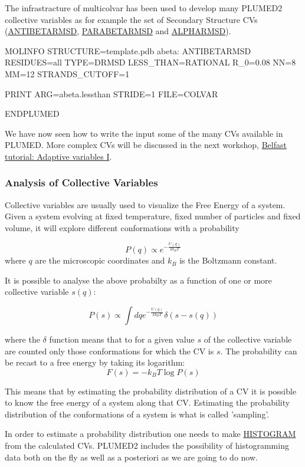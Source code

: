 The infrastracture of multicolvar has been used to develop many P\+L\+U\+M\+E\+D2 collective variables as for example the set of Secondary Structure C\+Vs (\hyperlink{ANTIBETARMSD}{A\+N\+T\+I\+B\+E\+T\+A\+R\+M\+S\+D}, \hyperlink{PARABETARMSD}{P\+A\+R\+A\+B\+E\+T\+A\+R\+M\+S\+D} and \hyperlink{ALPHARMSD}{A\+L\+P\+H\+A\+R\+M\+S\+D}).

\begin{DoxyVerb}MOLINFO STRUCTURE=template.pdb
abeta: ANTIBETARMSD RESIDUES=all TYPE=DRMSD LESS_THAN={RATIONAL R_0=0.08 NN=8 MM=12} STRANDS_CUTOFF=1

PRINT ARG=abeta.lessthan STRIDE=1 FILE=COLVAR 

ENDPLUMED
\end{DoxyVerb}


We have now seen how to write the input some of the many C\+Vs available in P\+L\+U\+M\+E\+D. More complex C\+Vs will be discussed in the next workshop, \hyperlink{belfast-2}{Belfast tutorial\+: Adaptive variables I}.\hypertarget{belfast-1_analysis}{}\subsubsection{Analysis of Collective Variables}\label{belfast-1_analysis}
Collective variables are usually used to visualize the Free Energy of a system. Given a system evolving at fixed temperature, fixed number of particles and fixed volume, it will explore different conformations with a probability

\[ P(q)\propto e^{-\frac{U(q)}{kb_BT}} \] where $ q $ are the microscopic coordinates and $ k_B $ is the Boltzmann constant.

It is possible to analyse the above probabilty as a function of one or more collective variable $ s(q)$\+:

\[ P(s)\propto \int dq e^{-\frac{U(q)}{kb_BT}} \delta(s-s(q)) \]

where the $ \delta $ function means that to for a given value $ s$ of the collective variable are counted only those conformations for which the C\+V is $ s$. The probability can be recast to a free energy by taking its logarithm\+: \[ F(s)=-k_B T \log P(s) \]

This means that by estimating the probability distribution of a C\+V it is possible to know the free energy of a system along that C\+V. Estimating the probability distribution of the conformations of a system is what is called 'sampling'.

In order to estimate a probability distribution one needs to make \hyperlink{HISTOGRAM}{H\+I\+S\+T\+O\+G\+R\+A\+M} from the calculated C\+Vs. P\+L\+U\+M\+E\+D2 includes the possibility of histogramming data both on the fly as well as a posteriori as we are going to do now.

